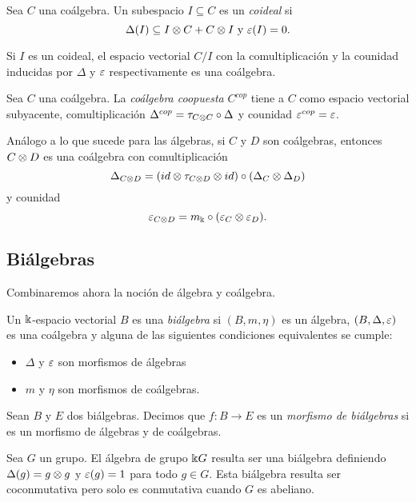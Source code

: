 \documentclass[a4paper,oneside,fleqn,11pt,../tesis.tex]{subfiles}
\begin{document}
\begin{definition}
	Sea $C$ una coálgebra. Un subespacio $I \subseteq C$ es un \emph{coideal} si 
	\[
		\Delta(I) \subseteq I \otimes C + C \otimes I \text{ y } \varepsilon(I) = 0.
	\]
\end{definition}

Si $I$ es un coideal, el espacio vectorial $C/I$ con la comultiplicación y la counidad
inducidas por $\Delta$ y $\varepsilon$ respectivamente es una coálgebra.

\begin{definition}
	Sea $C$ una coálgebra. La \emph{coálgebra coopuesta} $C^{cop}$ tiene a $C$ como espacio vectorial subyacente, 
	comultiplicación $\Delta^{cop} = \tau_{C \otimes C} \circ \Delta$ y counidad $\varepsilon^{cop} = \varepsilon$.
\end{definition}

\begin{obs}
	Análogo a lo que sucede para las álgebras, si $C$ y $D$ son coálgebras, entonces $C \otimes D$ es una coálgebra
	con comultiplicación
	\[
		\Delta_{C \otimes D} = (id \otimes \tau_{C \otimes D} \otimes id) \circ (\Delta_C \otimes \Delta_D)
	\] y counidad \[
		\varepsilon_{C \otimes D} = m_{\Bbbk} \circ (\varepsilon_C \otimes \varepsilon_D).
	\]
\end{obs}
\subsection{Biálgebras}
Combinaremos ahora la noción de álgebra y coálgebra.
\begin{definition}
	Un $\Bbbk$-espacio vectorial $B$ es una \emph{biálgebra} si $\left(B, m, \eta\right)$ es un álgebra,
	$\left(B, \Delta, \varepsilon \right)$ es una coálgebra y alguna de las siguientes condiciones equivalentes
	se cumple:
	\begin{itemize}
		\item $\Delta$ y $\varepsilon$ son morfismos de álgebras
		\item $m$ y $\eta$ son morfismos de coálgebras.
	\end{itemize}
\end{definition}

\begin{definition}
	Sean $B$ y $E$ dos biálgebras. Decimos que $f: B \to E$ es un \emph{morfismo de biálgebras} si
	es un morfismo de álgebras y de coálgebras.
\end{definition}

\begin{example}
	Sea $G$ un grupo. El álgebra de grupo $\Bbbk G$ resulta ser una biálgebra definiendo $\Delta(g) = g \otimes g$
	y $\varepsilon(g) = 1$ para todo $g \in G$. Esta biálgebra resulta ser coconmutativa pero solo es conmutativa
	cuando $G$ es abeliano. 
\end{example}
\end{document}
